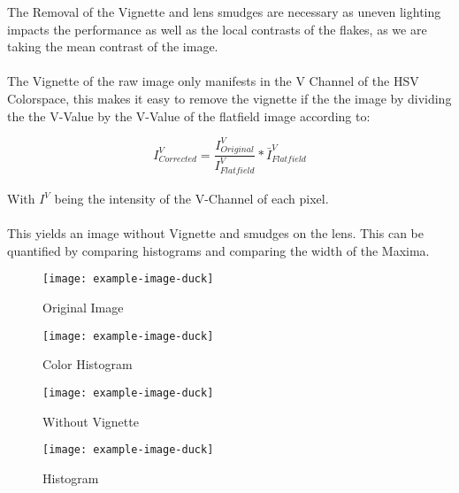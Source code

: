 The Removal of the Vignette and lens smudges are necessary as uneven lighting impacts the performance as well as the local contrasts of the flakes, as we are taking the mean contrast of the image.\\
\\
The Vignette of the raw image only manifests in the V Channel of the HSV Colorspace, this makes it easy to remove the vignette if the the image by dividing the the V-Value by the V-Value of the flatfield image according to:

\begin{equation}
    I^V_{Corrected} = \frac{I^V_{Original}}{I^V_{Flatfield}} * \bar{I}^V_{Flatfield}
\end{equation}
\\
With $I^V$ being the intensity of the V-Channel of each pixel.\\
\\
This yields an image without Vignette and smudges on the lens. This can be quantified by comparing histograms and comparing the width of the Maxima.

\begin{figure}[ht] 
  \label{ fig7} 
  \begin{minipage}[b]{0.45\linewidth}
    \centering
    \texttt{[image: example-image-duck]} 
    \caption{Original Image} 
    \vspace{4ex}
  \end{minipage}%
  \begin{minipage}[b]{0.45\linewidth}
    \centering
    \texttt{[image: example-image-duck]} 
    \caption{Color Histogram} 
    \vspace{4ex}
  \end{minipage} 
  \begin{minipage}[b]{0.45\linewidth}
    \centering
    \texttt{[image: example-image-duck]} 
    \caption{Without Vignette} 
    \vspace{4ex}
  \end{minipage}%
  \begin{minipage}[b]{0.45\linewidth}
    \centering
    \texttt{[image: example-image-duck]} 
    \caption{Histogram} 
    \vspace{4ex}
  \end{minipage} 
\end{figure}